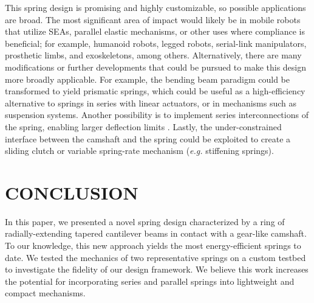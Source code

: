\documentclass[letterpaper, 10 pt, conference]{ieeeconf} %
\begin{document}
    This spring design is promising and highly customizable, so possible applications are broad. The most significant area of impact would likely be in mobile robots that utilize SEAs, parallel elastic mechanisms, or other uses where compliance is beneficial; for example, humanoid robots, legged robots, serial-link manipulators, prosthetic limbs, and exoskeletons, among others. Alternatively, there are many modifications or further developments that could be pursued to make this design more broadly applicable. For example, the bending beam paradigm could be transformed to yield prismatic springs, which could be useful as a high-efficiency alternative to springs in series with linear actuators, or in mechanisms such as suspension systems. Another possibility is to implement series interconnections of the spring, enabling larger deflection limits \cite{CarpinoEA2012JMD}. Lastly, the under-constrained interface between the camshaft and the spring could be exploited to create a sliding clutch or variable spring-rate mechanism (\textit{e.g.} stiffening springs).

\section{CONCLUSION}
In this paper, we presented a novel spring design characterized by a ring of radially-extending tapered cantilever beams in contact with a gear-like camshaft. To our knowledge, this new approach yields the most energy-efficient springs to date. We tested the mechanics of two representative springs on a custom testbed to investigate the fidelity of our design framework. We believe this work increases the potential for incorporating series and parallel springs into lightweight and compact mechanisms.






\end{document}
